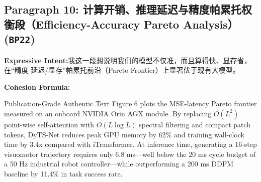\subsection*{Paragraph 10: 计算开销、推理延迟与精度帕累托权衡段（Efficiency-Accuracy Pareto Analysis） (\texttt{BP22})}
\noindent\textbf{Expressive Intent:}\enspace 我这一段想说明我们的模型不仅准，而且算得快、显存省，在“精度-延迟/显存”帕累托前沿（Pareto Frontier）上显著优于现有大模型。\par
\noindent\textbf{Cohesion Formula:}\par\vspace{4pt}
\begin{ExampleBox}{Publication-Grade Authentic Text}
Figure 6 plots the MSE-latency Pareto frontier measured on an onboard NVIDIA Orin AGX module. By replacing $O(L^2)$ point-wise self-attention with $O(L \log L)$ spectral filtering and compact patch tokens, DyTS-Net reduces peak GPU memory by 62\% and training wall-clock time by 3.4x compared with iTransformer. At inference time, generating a 16-step visuomotor trajectory requires only 6.8 ms---well below the 20 ms cycle budget of a 50 Hz industrial robot controller---while outperforming a 200 ms DDPM baseline by 11.4\% in task success rate.
\end{ExampleBox}
